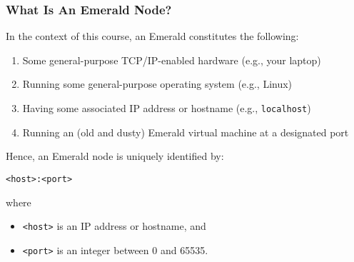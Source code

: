 \begin{frame}

\frametitle{What Is An Emerald Node?}

In the context of this course, an Emerald constitutes the following:

\begin{enumerate}

\footnotesize

\item Some general-purpose TCP/IP-enabled hardware (e.g., your laptop)

\item Running some general-purpose operating system (e.g., Linux)

\item Having some associated IP address or hostname (e.g.,
\texttt{localhost})

\item Running an (old and dusty) Emerald virtual machine at a
designated port

\end{enumerate}

\vspace{\fill}

Hence, an Emerald node is uniquely identified by:

\begin{center}

\texttt{<host>:<port>}

\end{center}

where

\begin{itemize}

\footnotesize

\item \texttt{<host>} is an IP address or hostname, and

\item \texttt{<port>} is an integer between 0 and 65535.

\end{itemize}

\end{frame}
